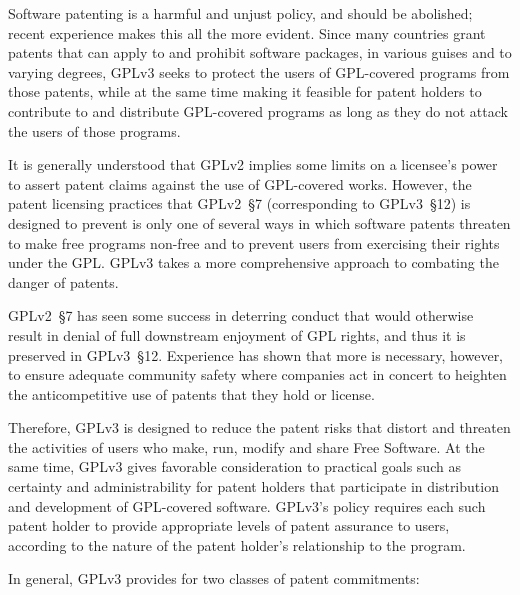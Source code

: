 Software patenting is a harmful and unjust policy, and should be abolished;
recent experience makes this all the more evident. Since many countries grant
patents that can apply to and prohibit software packages, in various guises
and to varying degrees, GPLv3 seeks to protect the users of GPL-covered programs
from those patents, while at the same time making it feasible for patent
holders to contribute to and distribute GPL-covered programs as long as they
do not attack the users of those programs.

It is generally understood that GPLv2 implies some limits on a licensee's
power to assert patent claims against the use of GPL-covered works.
However, the patent licensing practices that GPLv2~\S7 (corresponding to
GPLv3~\S12) is designed to prevent is only one of several ways in which
software patents threaten to make free programs non-free and to prevent users
from exercising their rights under the GPL. GPLv3 takes a more comprehensive
approach to combating the danger of patents.

GPLv2~\S7 has seen some success in deterring conduct that would otherwise
result in denial of full downstream enjoyment of GPL rights, and thus it is
preserved in GPLv3~\S12.  Experience has shown that more is necessary,
however, to ensure adequate community safety where companies act in concert
to heighten the anticompetitive use of patents that they hold or license.

Therefore,  GPLv3 is designed to reduce the patent risks that distort and
threaten the activities of users who make, run, modify and share Free
Software.  At the same time, GPLv3 gives favorable consideration to practical
goals such as certainty and administrability for patent holders that
participate in distribution and development of GPL-covered software.  GPLv3's
policy requires each such patent holder to provide appropriate levels of
patent assurance to users, according to the nature of the patent holder's
relationship to the program.

In general, GPLv3 provides for two classes of patent commitments:

